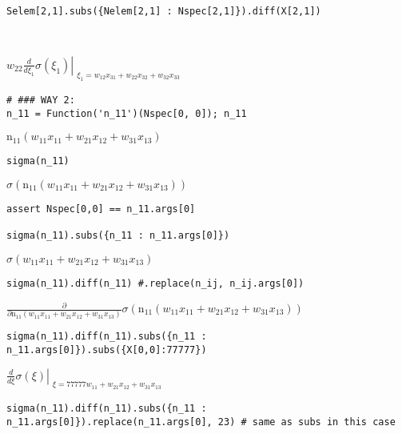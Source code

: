 \documentclass[
]{article}
\begin{document}
\begin{verbatim}
Selem[2,1].subs({Nelem[2,1] : Nspec[2,1]}).diff(X[2,1])



\end{verbatim}

\(\displaystyle w_{22} \left. \frac{d}{d \xi_{1}} \sigma{\left(\xi_{1} \right)} \right|_{\substack{ \xi_{1}=w_{12} x_{31} + w_{22} x_{32} + w_{32} x_{33} }}\)

\begin{verbatim}
# ### WAY 2:
n_11 = Function('n_11')(Nspec[0, 0]); n_11
\end{verbatim}

\(\displaystyle \operatorname{n_{11}}{\left(w_{11} x_{11} + w_{21} x_{12} + w_{31} x_{13} \right)}\)

\begin{verbatim}
sigma(n_11)
\end{verbatim}

\(\displaystyle \sigma{\left(\operatorname{n_{11}}{\left(w_{11} x_{11} + w_{21} x_{12} + w_{31} x_{13} \right)} \right)}\)

\begin{verbatim}
assert Nspec[0,0] == n_11.args[0]

sigma(n_11).subs({n_11 : n_11.args[0]})
\end{verbatim}

\(\displaystyle \sigma{\left(w_{11} x_{11} + w_{21} x_{12} + w_{31} x_{13} \right)}\)

\begin{verbatim}
sigma(n_11).diff(n_11) #.replace(n_ij, n_ij.args[0])
\end{verbatim}

\(\displaystyle \frac{\partial}{\partial \operatorname{n_{11}}{\left(w_{11} x_{11} + w_{21} x_{12} + w_{31} x_{13} \right)}} \sigma{\left(\operatorname{n_{11}}{\left(w_{11} x_{11} + w_{21} x_{12} + w_{31} x_{13} \right)} \right)}\)

\begin{verbatim}
sigma(n_11).diff(n_11).subs({n_11 : n_11.args[0]}).subs({X[0,0]:77777})
\end{verbatim}

\(\displaystyle \left. \frac{d}{d \xi} \sigma{\left(\xi \right)} \right|_{\substack{ \xi=77777 w_{11} + w_{21} x_{12} + w_{31} x_{13} }}\)

\begin{verbatim}
sigma(n_11).diff(n_11).subs({n_11 : n_11.args[0]}).replace(n_11.args[0], 23) # same as subs in this case
\end{verbatim}
\end{document}
